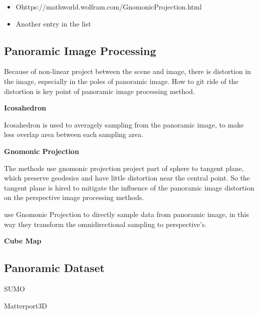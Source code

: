 \begin{itemize}
	\item Ohttps://mathworld.wolfram.com/GnomonicProjection.html
	\item Another entry in the list
\end{itemize}



\subsection{Panoramic Image Processing}

Because of non-linear project between the scene and image, there is distortion in the image, especially in the poles of panoramic image.
How to git ride of the distortion is key point of panoramic image processing method. 

\textbf{Icosahedron}

Icosahedron is used to averagely sampling from the panoramic image, to make less overlap area between each sampling area.

\cite{eder2019mapped}





\textbf{Gnomonic Projection} ~\cite{gnomonicprojection}

The methods use gnomonic projection project part of sphere to tangent plane, which preserve geodesics and have little distortion near the central point.
So the tangent plane is hired to mitigate the influence of the panoramic image  distortion on the perspective image processing methods.

\cite{coors2018spherenet} use Gnomonic Projection to directly sample data from panoramic image, in this way they transform the omnidirectional sampling to perspective's.

\textbf{Cube Map}


\subsection{Panoramic Dataset}


SUMO

Matterport3D


